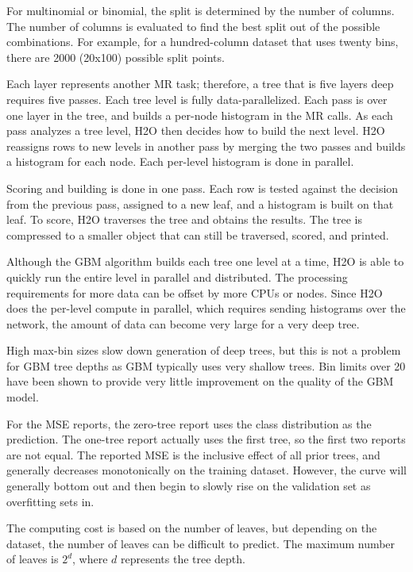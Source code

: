 {For multinomial or binomial, the split is determined by the number of columns. The number of columns is evaluated to find the best split out of the possible combinations. For example, for a hundred-column dataset that uses twenty bins, there are 2000 (20x100) possible split points. 

Each layer represents another MR task; therefore, a tree that is five layers deep requires five passes. Each tree level is fully data-parallelized. Each pass is over one layer in the tree, and builds a per-node histogram in the MR calls. As each pass analyzes a tree level, H2O then decides how to build the next level. H2O reassigns rows to new levels in another pass by merging the two passes and builds a histogram for each node. Each per-level histogram is done in parallel. 

Scoring and building is done in one pass. Each row is tested against the decision from the previous pass, assigned to a new leaf, and a histogram is built on that leaf. To score, H2O traverses the tree and obtains the results. The tree is compressed to a smaller object that can still be traversed, scored, and printed. 

Although the GBM algorithm builds each tree one level at a time, H2O is able to quickly run the entire level in parallel and distributed. The processing requirements for more data can be offset by more CPUs or nodes.  Since H2O does the per-level compute in parallel, which requires sending histograms over the network, the amount of data can become very large for a very deep tree. 

High max-bin sizes slow down generation of deep trees, but this is not a problem for GBM tree depths as GBM typically uses very shallow trees. Bin limits over 20 have been shown to provide very little improvement on the quality of the GBM model. 

For the MSE reports, the zero-tree report uses the class distribution as the prediction. The one-tree report actually uses the first tree, so the first two reports are not equal. The reported MSE is the inclusive effect of all prior trees, and generally decreases monotonically on the training dataset. However, the curve will generally bottom out and then begin to slowly rise on the validation set as overfitting sets in. 

The computing cost is based on the number of leaves, but depending on the dataset, the number of leaves can be difficult to predict. The maximum number of leaves is $2^d$, where $d$ represents the tree depth.

}
